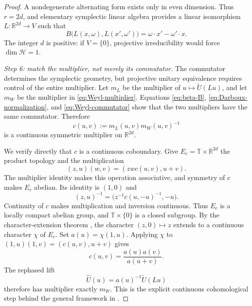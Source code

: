 \documentclass[10pt,a4paper]{amsart}
\numberwithin{equation}{section}
\newcommand{\cH}{\mathcal H}
\newcommand{\R}{\mathbb R}
\newcommand{\T}{\mathbb T}
\newcommand{\Step}[1]{\par\medskip\noindent\textit{#1.}\quad}
\begin{document}
\begin{proof}
A nondegenerate alternating form exists only in even dimension.  Thus
$r=2d$, and elementary symplectic linear algebra provides a linear
isomorphism $L:\R^{2d}\to V$ such that
\begin{equation}\label{eq:Darboux-normalization}
 B\bigl(L(x,\omega),L(x',\omega')\bigr)
 =\omega\cdot x'-\omega'\cdot x.
\end{equation}
The integer $d$ is positive: if $V=\{0\}$, projective irreducibility would
force $\dim\cH=1$.

\Step{Step 6: match the multiplier, not merely its commutator}
The commutator determines the symplectic geometry, but projective unitary
equivalence requires control of the entire multiplier.  Let $m_L$ be the
multiplier of $u\mapsto\widetilde U(Lu)$, and let $m_W$ be
the multiplier in \eqref{eq:Weyl-multiplier}.  Equations
\eqref{eq:beta-B}, \eqref{eq:Darboux-normalization}, and
\eqref{eq:Weyl-commutator} show that the two multipliers have the same
commutator.  Therefore
\[
 c(u,v):=m_L(u,v)m_W(u,v)^{-1}
\]
is a continuous symmetric multiplier on $\R^{2d}$.

We verify directly that $c$ is a continuous coboundary.  Give
$E_c=\T\times\R^{2d}$ the product topology and the multiplication
\begin{equation}\label{eq:central-extension-product}
 (z,u)(w,v)=(zwc(u,v),u+v).
\end{equation}
The multiplier identity makes this operation associative, and symmetry of
$c$ makes $E_c$ abelian.  Its identity is $(1,0)$ and
\[
 (z,u)^{-1}=\bigl(z^{-1}c(u,-u)^{-1},-u\bigr).
\]
Continuity of $c$ makes multiplication and inversion continuous.  Thus
$E_c$ is a locally compact abelian group, and $\T\times\{0\}$ is a closed
subgroup.  By the character-extension theorem
\cite[Corollary~4.42]{FollandAbstract2016}, the character $(z,0)\mapsto z$
extends to a continuous character $\chi$ of $E_c$.  Set $a(u)=\chi(1,u)$.
Applying $\chi$ to $(1,u)(1,v)=(c(u,v),u+v)$ gives
\begin{equation}\label{eq:c-coboundary}
 c(u,v)=\frac{a(u)a(v)}{a(u+v)}.
\end{equation}
The rephased lift
\begin{equation}\label{eq:rephased-lift}
 \widehat U(u)=a(u)^{-1}\widetilde U(Lu)
\end{equation}
therefore has multiplier exactly $m_W$.  This is the explicit continuous
cohomological step behind the general framework in \cite{Kleppner1965}.


\end{proof}
\end{document}
